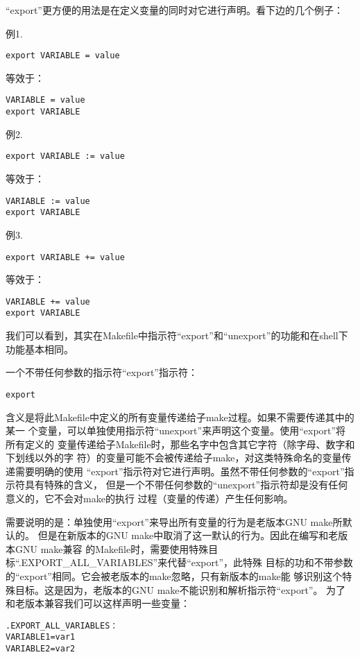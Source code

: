 “export”更方便的用法是在定义变量的同时对它进行声明。看下边的几个例子：

例1.
\begin{Verbatim}[]
export VARIABLE = value
\end{Verbatim}
等效于：
\begin{Verbatim}[]
VARIABLE = value
export VARIABLE
\end{Verbatim}

例2.
\begin{Verbatim}[]
export VARIABLE := value
\end{Verbatim}

等效于：
\begin{Verbatim}[]
VARIABLE := value
export VARIABLE
\end{Verbatim}

例3.
\begin{Verbatim}[]
export VARIABLE += value
\end{Verbatim}
等效于：
\begin{Verbatim}[]
VARIABLE += value
export VARIABLE
\end{Verbatim}

我们可以看到，其实在Makefile中指示符“export”和“unexport”的功能和在shell下功能基本相同。

一个不带任何参数的指示符“export”指示符：
\begin{Verbatim}[]
export
\end{Verbatim}


含义是将此Makefile中定义的所有变量传递给子make过程。如果不需要传递其中的某一
个变量，可以单独使用指示符“unexport”来声明这个变量。使用“export”将所有定义的
变量传递给子Makefile时，那些名字中包含其它字符（除字母、数字和下划线以外的字
符）的变量可能不会被传递给子make，对这类特殊命名的变量传递需要明确的使用
“export”指示符对它进行声明。虽然不带任何参数的“export”指示符具有特殊的含义，
但是一个不带任何参数的“unexport”指示符却是没有任何意义的，它不会对make的执行
过程（变量的传递）产生任何影响。

需要说明的是：单独使用“export”来导出所有变量的行为是老版本GNU make所默认的。
但是在新版本的GNU make中取消了这一默认的行为。因此在编写和老版本GNU make兼容
的Makefile时，需要使用特殊目标“.EXPORT\_ALL\_VARIABLES”来代替“export”，此特殊
目标的功和不带参数的“export”相同。它会被老版本的make忽略，只有新版本的make能
够识别这个特殊目标。这是因为，老版本的GNU make不能识别和解析指示符“export”。
为了和老版本兼容我们可以这样声明一些变量：
\begin{Verbatim}[]
.EXPORT_ALL_VARIABLES：
VARIABLE1=var1
VARIABLE2=var2
\end{Verbatim}

